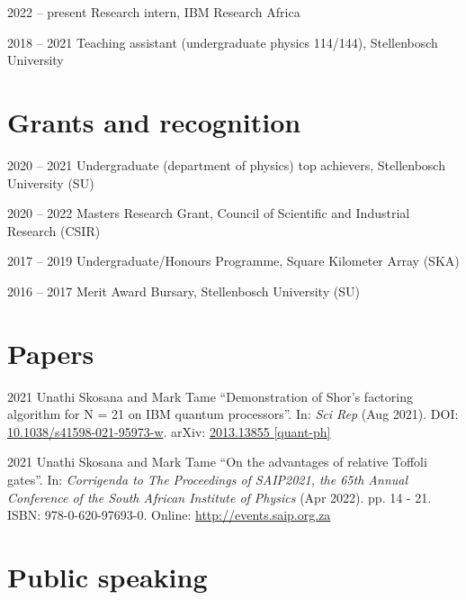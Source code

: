 \documentclass[10pt]{extreport}
\begin{document}
    \begin{tablist}
      \item[2022 -- present]  \tab{} Research intern, IBM Research Africa
      \item[2018 -- 2021] \tab{} Teaching assistant (undergraduate physics 114/144), Stellenbosch University
    \end{tablist}

    \section*{Grants and recognition}

    \begin{tablist}
		  \item[2020 -- 2021] \tab{} Undergraduate (department of physics) top achievers, Stellenbosch University (SU)
		  \item[2020 -- 2022]  \tab{} Masters Research Grant, Council of Scientific and Industrial Research (CSIR)
		  \item[2017 -- 2019]  \tab{} Undergraduate/Honours Programme, Square Kilometer Array (SKA)
		  \item[2016 -- 2017]  \tab{} Merit Award Bursary, Stellenbosch University (SU)
	  \end{tablist}

    \section*{Papers}

    \begin{tablist}
        \item[2021] \tab{}Unathi Skosana and Mark Tame \enquote{Demonstration of Shor’s factoring algorithm for N = 21 on IBM quantum processors}. In: \textit{Sci Rep} (Aug 2021). DOI: \href{https://doi.org/10.1038/s41598-021-95973-w}{10.1038/s41598-021-95973-w}. arXiv: \href{https://arxiv.org/abs/2103.13855}{2013.13855 [quant-ph]}
        \item[2021] \tab{}Unathi Skosana and Mark Tame \enquote{On the advantages of relative
          Toffoli gates}. In: \textit{Corrigenda to The Proceedings of SAIP2021, the 65th  Annual Conference of
          the South African Institute of Physics} (Apr 2022). pp. 14 - 21. ISBN:
          978-0-620-97693-0. Online: \url{http://events.saip.org.za}

    \end{tablist}

    \section*{Public speaking}
\end{document}

